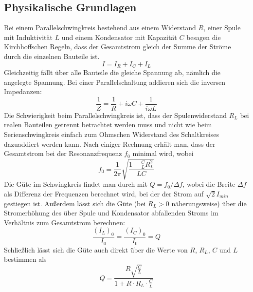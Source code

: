 \documentclass[12pt,a4paper]{article}
\begin{document}
\subsection{Physikalische Grundlagen}
Bei einem Parallelschwingkreis bestehend aus einem Widerstand $R$, einer Spule mit Induktivität $L$ und einem Kondensator mit Kapazität $C$ besagen die Kirchhoffschen Regeln, dass der Gesamtstrom gleich der Summe der Ströme durch die einzelnen Bauteile ist.
\begin{equation}
I=I_R+I_C+I_L
\end{equation}
Gleichzeitig fällt über alle Bauteile die gleiche Spannung ab, nämlich die angelegte Spannung. Bei einer Parallelschaltung addieren sich die inversen Impedanzen:
\begin{equation}
\frac{1}{Z}=\frac{1}{R}+i\omega C+\frac{1}{i\omega L}
\end{equation}
Die Schwierigkeit beim Parallelschwingkreis ist, dass der Spulenwiderstand $R_L$ bei realen Bauteilen getrennt betrachtet werden muss und nicht wie beim Serienschwingkreis einfach zum Ohmschen Widerstand des Schaltkreises dazuaddiert werden kann. Nach einiger Rechnung erhält man, dass der Gesamtstrom bei der Resonanzfrequenz $f_0$ minimal wird, wobei
\begin{equation}
f_0=\frac{1}{2\pi}\sqrt{\frac{1-\frac{C}{L}R_L^2}{LC}}
\end{equation}
Die Güte im Schwingkreis findet man durch mit $Q=f_0/\Delta f$, wobei die Breite $\Delta f$ als Differenz der Frequenzen berechnet wird, bei der der Strom auf $\sqrt{2}I_{min}$ gestiegen ist. Außerdem lässt sich die Güte (bei $R_L>0$ näherungsweise) über die Stromerhöhung des über Spule und Kondensator abfallenden Stroms im Verhältnis zum Gesamtstrom berechnen:
\begin{equation}
\frac{(I_L)_0}{I_0}=\frac{(I_C)_0}{I_0}=Q
\end{equation}  
Schließlich lässt sich die Güte auch direkt über die Werte von $R$, $R_L$, $C$ und $L$ bestimmen als 
\begin{equation}\label{eq:guete_parallelschaltkreis}
Q=\frac{R\sqrt{\frac{C}{L}}}{1+R\cdot R_L\cdot \frac{C}{L}}
\end{equation}
\end{document}
